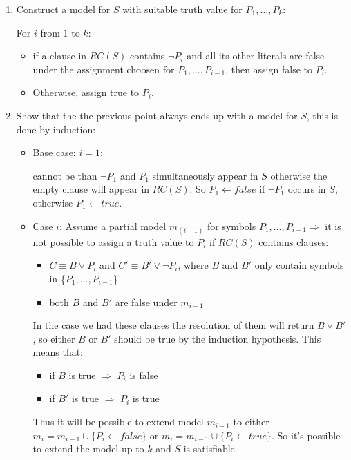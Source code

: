 \documentclass[12pt]{article}
\begin{document}
\begin{enumerate}[label=\textbf{PL.\arabic*}]
    \begin{enumerate}
        \item Construct a model for $S$ with suitable truth value for $P_1,\ldots,P_k$:
        
        For $i$ from $1$ to $k$:
        \begin{itemize}
            \item if a clause in $RC(S)$ contains $\lnot P_i$ and all its other literals are false under the assignment choosen for $P_1,\ldots,P_{i-1}$, 
            then assign false to $P_i$.
            \item Otherwise, assign true to $P_i$.       
        \end{itemize}
        \item Show that the the previous point always ends up with a model for $S$, this is done by induction:
        \begin{itemize}
            \item Base case: $i = 1$:
            
            cannot be than $\lnot P_1$ and $P_1$ simultaneously appear in $S$ otherwise the empty clause will appear in $RC(S)$.
            So $P_1 \leftarrow false$ if $\lnot P_1$ occurs in $S$, otherwise $P_1 \leftarrow true$.
            \item Case $i$: Assume a partial model $m_(i-1)$ for symbols $P_1,\ldots,P_{i-1}\Rightarrow$ it is not possible to assign a truth value to $P_i$ if $RC(S)$
            contains clauses:
            \begin{itemize}
                \item $C\equiv B\lor P_i$ and $C'\equiv B'\lor\lnot P_i$, where $B$ and $B'$ only contain symbols in \{$P_1,\ldots,P_{i-1}$\}
                \item both $B$ and $B'$ are false under $m_{i-1}$
            \end{itemize}
            In the case we had these clauses the resolution of them will return $B\lor B'$, so either $B$ or $B'$ should be true by the induction hypothesis. 
            This means that:
            \begin{itemize}
                \item if $B$ is true $\Rightarrow$ $P_i$ is false
                \item if $B'$ is true $\Rightarrow$ $P_i$ is true
            \end{itemize}
            Thus it will be possible to extend model $m_{i-1}$ to either $m_i = m_{i-1}\cup\{P_i \leftarrow false\}$ or $m_i = m_{i-1}\cup\{P_i \leftarrow true\}$.
            So it's possible to extend the model up to $k$ and $S$ is satisfiable.
        \end{itemize}
    \end{enumerate}
\end{enumerate}
\end{document}
